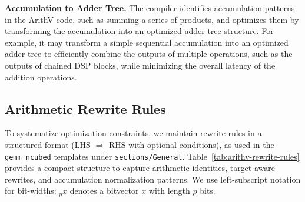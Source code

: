 \noindent\textbf{Accumulation to Adder Tree.}
The compiler identifies accumulation patterns in the ArithV code, such as summing a series of products, and optimizes them by transforming the accumulation into an optimized adder tree structure.
For example, it may transform a simple sequential accumulation into an optimized adder tree to efficiently combine the outputs of multiple operations, such as the outputs of chained DSP blocks, while minimizing the overall latency of the addition operations.


\subsection{Arithmetic Rewrite Rules}

To systematize optimization constraints, we maintain rewrite rules in a structured format (LHS $\Rightarrow$ RHS with optional conditions), as used in the \texttt{gemm\_ncubed} templates under \texttt{sections/General}.
Table~\ref{tab:arithv-rewrite-rules} provides a compact structure to capture arithmetic identities, target-aware rewrites, and accumulation normalization patterns.
We use left-subscript notation for bit-widths: ${}_p x$ denotes a bitvector $x$ with length $p$ bits.

